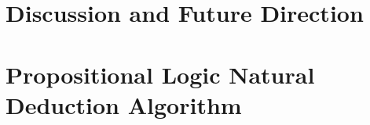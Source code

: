 \documentclass[ms]{uncgdissertationexp2}
\theoremstyle{plain}
\theoremstyle{definition}
\theoremstyle{remark}
\begin{document}
\chapter{Discussion and Future Direction}




\nocite{*}

\appendix
\label{appendix:algorithm}
\chapter{Propositional Logic Natural Deduction Algorithm}
\end{document}
